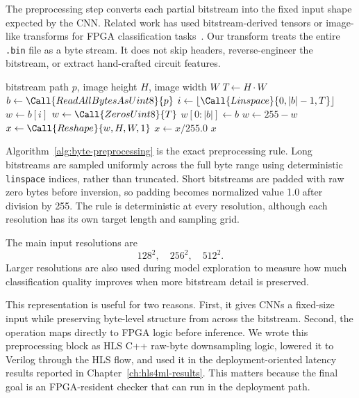 The preprocessing step converts each partial bitstream into the fixed input shape expected by the CNN. Related work has used bitstream-derived tensors or image-like transforms for FPGA classification tasks~\cite{rettkowski2019inspection,chaudhuri2022detection,chen2020bitstreamimage}. Our transform treats the entire \texttt{.bin} file as a byte stream. It does not skip headers, reverse-engineer the bitstream, or extract hand-crafted circuit features.

\begin{algorithm}[t]
    \caption{Pseudocode for deterministic byte-image preprocessing.}
    \label{alg:byte-preprocessing}
    \begin{algorithmic}[1]
        \Require bitstream path $p$, image height $H$, image width $W$
        \State $T \gets H \cdot W$
        \State $b \gets \Call{ReadAllBytesAsUint8}{p}$
            \State $i \gets \lfloor \Call{Linspace}{0, |b|-1, T} \rfloor$
            \State $w \gets b[i]$
        \Else
            \State $w \gets \Call{ZerosUint8}{T}$
            \State $w[0:|b|] \gets b$
        \EndIf
        \State $w \gets 255 - w$
        \State $x \gets \Call{Reshape}{w, H, W, 1}$
        \State $x \gets x / 255.0$
        \State \Return $x$
    \end{algorithmic}
\end{algorithm}

Algorithm~\ref{alg:byte-preprocessing} is the exact preprocessing rule. Long bitstreams are sampled uniformly across the full byte range using deterministic \texttt{linspace} indices, rather than truncated. Short bitstreams are padded with raw zero bytes before inversion, so padding becomes normalized value 1.0 after division by 255. The rule is deterministic at every resolution, although each resolution has its own target length and sampling grid.

The main input resolutions are
\[
    128^2,\quad 256^2,\quad 512^2.
\]
Larger resolutions are also used during model exploration to measure how much classification quality improves when more bitstream detail is preserved.

This representation is useful for two reasons. First, it gives CNNs a fixed-size input while preserving byte-level structure from across the bitstream. Second, the operation maps directly to FPGA logic before inference. We wrote this preprocessing block as HLS C++ raw-byte downsampling logic, lowered it to Verilog through the HLS flow, and used it in the deployment-oriented latency results reported in Chapter~\ref{ch:hls4ml-results}. This matters because the final goal is an FPGA-resident checker that can run in the deployment path.

